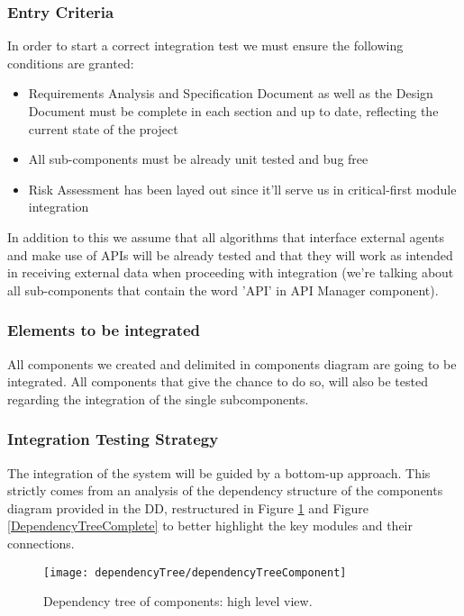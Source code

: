 \subsubsection{Entry Criteria}
	In order to start a correct integration test we must ensure the following conditions are granted:

	\begin{itemize}
		\item Requirements Analysis and Specification Document as well as the Design Document must be complete in each section and up to date, reflecting the current state of the project
		\item All sub-components must be already unit tested and bug free
		\item Risk Assessment has been layed out since it'll serve us in critical-first module integration
	\end{itemize}

	In addition to this we assume that all algorithms that interface external agents and make use of APIs will be already tested and that they will work as intended in receiving external data when proceeding with integration (we're talking about all sub-components that contain the word 'API' in API Manager component).


\subsubsection{Elements to be integrated}
	All components we created and delimited in components diagram are going to be integrated. All components that give the chance to do so, will also be tested regarding the integration of the single subcomponents.


\subsubsection{Integration Testing Strategy}
	The integration of the system will be guided by a bottom-up approach. This strictly comes from an analysis of the dependency structure of the components diagram provided in the DD, restructured in Figure \ref{DependencyTreehighLevel} and Figure \ref{DependencyTreeComplete} to better highlight the key modules and their connections.
	
	\begin{figure}[H]
		\centering
		\texttt{[image: dependencyTree/dependencyTreeComponent]}
		\caption{Dependency tree of components: high level view.}
		\label{DependencyTreehighLevel}
	\end{figure}
	
